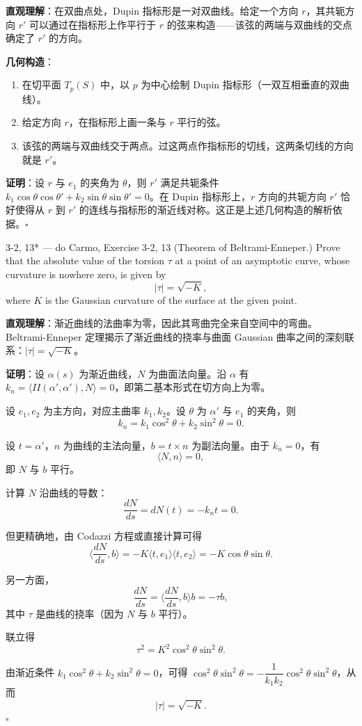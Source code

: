 \begin{solution}
\textbf{直观理解}：在双曲点处，Dupin 指标形是一对双曲线。给定一个方向 $r$，其共轭方向 $r'$ 可以通过在指标形上作平行于 $r$ 的弦来构造——该弦的两端与双曲线的交点确定了 $r'$ 的方向。

\textbf{几何构造}：
\begin{enumerate}
\item 在切平面 $T_p(S)$ 中，以 $p$ 为中心绘制 Dupin 指标形（一双互相垂直的双曲线）。
\item 给定方向 $r$，在指标形上画一条与 $r$ 平行的弦。
\item 该弦的两端与双曲线交于两点。过这两点作指标形的切线，这两条切线的方向就是 $r'$。
\end{enumerate}

\textbf{证明}：设 $r$ 与 $e_1$ 的夹角为 $\theta$，则 $r'$ 满足共轭条件 $k_1 \cos\theta\cos\theta' + k_2 \sin\theta\sin\theta' = 0$。在 Dupin 指标形上，$r$ 方向的共轭方向 $r'$ 恰好使得从 $r$ 到 $r'$ 的连线与指标形的渐近线对称。这正是上述几何构造的解析依据。$\square$
\end{solution}

\begin{exercise}{3-2, 13* — do Carmo, Exercise 3-2, 13}
(Theorem of Beltrami-Enneper.) Prove that the absolute value of the torsion $\tau$ at a point of an asymptotic curve, whose curvature is nowhere zero, is given by
\[
| \tau | = \sqrt {- K},
\]
where $K$ is the Gaussian curvature of the surface at the given point.
\end{exercise}

\begin{solution}
\textbf{直观理解}：渐近曲线的法曲率为零，因此其弯曲完全来自空间中的弯曲。Beltrami-Enneper 定理揭示了渐近曲线的挠率与曲面 Gaussian 曲率之间的深刻联系：$|\tau| = \sqrt{-K}$。

\textbf{证明}：设 $\alpha(s)$ 为渐近曲线，$N$ 为曲面法向量。沿 $\alpha$ 有 $k_n = \langle II(\alpha', \alpha'), N \rangle = 0$，即第二基本形式在切方向上为零。

设 $e_1, e_2$ 为主方向，对应主曲率 $k_1, k_2$。设 $\theta$ 为 $\alpha'$ 与 $e_1$ 的夹角，则
\[
k_n = k_1 \cos^2\theta + k_2 \sin^2\theta = 0.
\]

设 $t = \alpha'$，$n$ 为曲线的主法向量，$b = t \times n$ 为副法向量。由于 $k_n = 0$，有
\[
\langle N, n \rangle = 0,
\]
即 $N$ 与 $b$ 平行。

计算 $N$ 沿曲线的导数：
\[
\frac{dN}{ds} = dN(t) = -k_n t = 0.
\]

但更精确地，由 Codazzi 方程或直接计算可得
\[
\langle \frac{dN}{ds}, b \rangle = -K \langle t, e_1 \rangle \langle t, e_2 \rangle = -K \cos\theta\sin\theta.
\]

另一方面，
\[
\frac{dN}{ds} = \langle \frac{dN}{ds}, b \rangle b = -\tau b,
\]
其中 $\tau$ 是曲线的挠率（因为 $N$ 与 $b$ 平行）。

联立得
\[
\tau^2 = K^2 \cos^2\theta\sin^2\theta.
\]

由渐近条件 $k_1 \cos^2\theta + k_2 \sin^2\theta = 0$，可得 $\cos^2\theta\sin^2\theta = -\dfrac{1}{k_1 k_2} \cos^2\theta\sin^2\theta$，从而
\[
|\tau| = \sqrt{-K}.
\]
$\square$
\end{solution}

